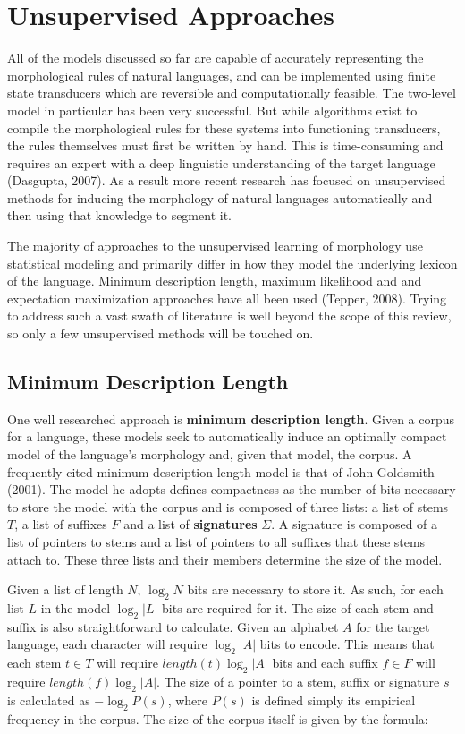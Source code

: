 \documentclass[12pt]{article}
\begin{document}
\section{Unsupervised Approaches}
All of the models discussed so far are capable of accurately representing the morphological rules of natural languages, and can be implemented using finite state transducers which are reversible and computationally feasible. The two-level model in particular has been very successful. But while algorithms exist to compile the morphological rules for these systems into functioning transducers, the rules themselves must first be written by hand. This is time-consuming and requires an expert with a deep linguistic understanding of the target language (Dasgupta, 2007). As a result more recent research has focused on unsupervised methods for inducing the morphology of natural languages automatically and then using that knowledge to segment it.

The majority of approaches to the unsupervised learning of morphology use statistical modeling and primarily differ in how they model the underlying lexicon of the language. Minimum description length, maximum likelihood and and expectation maximization approaches have all been used (Tepper, 2008). Trying to address such a vast swath of literature is well beyond the scope of this review, so only a few unsupervised methods will be touched on.

\subsection{Minimum Description Length}
One well researched approach is \textbf{minimum description length}. Given a corpus for a language, these models seek to automatically induce an optimally compact model of the language's morphology and, given that model, the corpus. A frequently cited minimum description length model is that of John Goldsmith (2001). The model he adopts defines compactness as the number of bits necessary to store the model with the corpus and is composed of three lists: a list of stems $T$, a list of suffixes $F$ and a list of \textbf{signatures} $\Sigma$. A signature is composed of a list of pointers to stems and a list of pointers to all suffixes that these stems attach to. These three lists and their members determine the size of the model.

Given a list of length $N$, $\log_2N$ bits are necessary to store it. As such, for each list $L$ in the model $\log_2 \vert L \vert$ bits are required for it. The size of each stem and suffix is also straightforward to calculate. Given an alphabet $A$ for the target language, each character will require $\log_2 \vert A \vert$ bits to encode. This means that each stem $t \in T$ will require $length(t) \log_2 \vert A \vert$ bits and each suffix $f \in F$ will require $length(f) \log_2 \vert A \vert$. The size of a pointer to a stem, suffix or signature $s$ is calculated as $-\log_2P(s)$, where $P(s)$ is defined simply its empirical frequency in the corpus. The size of the corpus itself is given by the formula:
\end{document}
